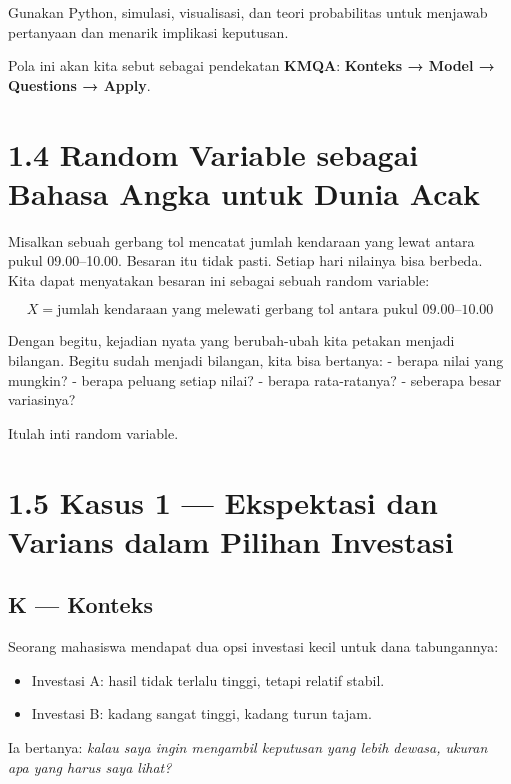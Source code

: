 \documentclass[
  letterpaper,
  DIV=11,
  numbers=noendperiod]{scrreprt}
\providecommand{\tightlist}{%
  \setlength{\itemsep}{0pt}\setlength{\parskip}{0pt}}
\begin{document}
Gunakan Python, simulasi, visualisasi, dan teori probabilitas untuk
menjawab pertanyaan dan menarik implikasi keputusan.

Pola ini akan kita sebut sebagai pendekatan \textbf{KMQA}:
\textbf{Konteks → Model → Questions → Apply}.

\section{1.4 Random Variable sebagai Bahasa Angka untuk Dunia
Acak}\label{random-variable-sebagai-bahasa-angka-untuk-dunia-acak}

Misalkan sebuah gerbang tol mencatat jumlah kendaraan yang lewat antara
pukul 09.00--10.00. Besaran itu tidak pasti. Setiap hari nilainya bisa
berbeda. Kita dapat menyatakan besaran ini sebagai sebuah random
variable:

\[
X = \text{jumlah kendaraan yang melewati gerbang tol antara pukul 09.00–10.00}
\]

Dengan begitu, kejadian nyata yang berubah-ubah kita petakan menjadi
bilangan. Begitu sudah menjadi bilangan, kita bisa bertanya: - berapa
nilai yang mungkin? - berapa peluang setiap nilai? - berapa
rata-ratanya? - seberapa besar variasinya?

Itulah inti random variable.

\section{1.5 Kasus 1 --- Ekspektasi dan Varians dalam Pilihan
Investasi}\label{kasus-1-ekspektasi-dan-varians-dalam-pilihan-investasi}

\subsection{K --- Konteks}\label{k-konteks-1}

Seorang mahasiswa mendapat dua opsi investasi kecil untuk dana
tabungannya:

\begin{itemize}
\tightlist
\item
  Investasi A: hasil tidak terlalu tinggi, tetapi relatif stabil.
\item
  Investasi B: kadang sangat tinggi, kadang turun tajam.
\end{itemize}

Ia bertanya: \emph{kalau saya ingin mengambil keputusan yang lebih
dewasa, ukuran apa yang harus saya lihat?}
\end{document}
